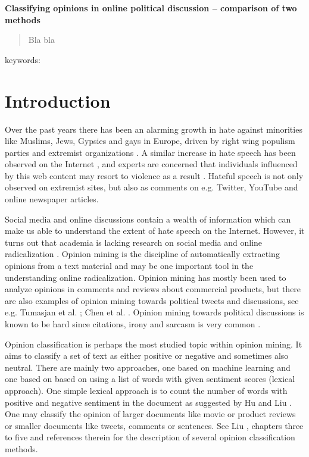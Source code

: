 \documentclass[11pt]{article}
\begin{document}
\begin{center}
  \textbf{\Large{Classifying opinions in online political discussion -- comparison of two methods}}

\vspace{5mm}

\end{center}

\begin{abstract}
Bla bla
\end{abstract}

keywords: \textit{}

\section{Introduction}
\label{sec:introduction}

Over the past years there has been an alarming growth in hate against minorities like Muslims, Jews, Gypsies and gays in Europe, driven by right wing populism parties and extremist organizations \cite{r4,r11}. A similar increase in hate speech has been observed on the Internet \cite{r6,s2}, and experts are concerned that individuals influenced by this web content may resort to violence as a result \cite{Strommen12,Sunde13}. Hateful speech is not only observed on extremist sites, but also as comments on e.g. Twitter, YouTube and online newspaper articles.  

Social media and online discussions contain a wealth of information which can make us able to understand the extent of hate speech on the Internet. However, it turns out that academia is lacking research on social media and online radicalization \cite{s1}. Opinion mining is the discipline of automatically extracting opinions from a text material and may be one important tool in the understanding online radicalization. Opinion mining has mostly been used to analyze opinions in comments and reviews about commercial products, but there are also examples of opinion mining towards political tweets and discussions, see e.g. Tumasjan et al. ; Chen et al. . Opinion mining towards political discussions is known to be hard since citations, irony and sarcasm is very common \cite{Bing12}.

Opinion classification is perhaps the most studied topic within opinion mining. It aims to classify a set of text as either positive or negative and sometimes also neutral. There are mainly two approaches, one based on machine learning and one based on based on using a list of words with given sentiment scores (lexical approach). One simple lexical approach is to count the number of words with positive and negative sentiment in the document as suggested by Hu and Liu . One may classify the opinion of larger documents like movie or product reviews or smaller documents like tweets, comments or sentences. See Liu , chapters three to five and references therein for the description of several opinion classification methods. 
\end{document}
